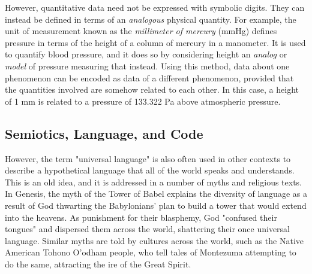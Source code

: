 However, quantitative data need not be expressed with symbolic digits. They can instead be defined in terms of an \textit{analogous} physical quantity. For example, the unit of measurement known as the \textit{millimeter of mercury} (mmHg) defines pressure in terms of the height of a column of mercury in a manometer. It is used to quantify blood pressure, and it does so by considering height an \textit{analog} or \textit{model} of pressure measuring that instead. Using this method, data about one phenomenon can be encoded as data of a different phenomenon, provided that the quantities involved are somehow related to each other. In this case, a height of 1 mm is related to a pressure of 133.322 Pa above atmospheric pressure. \\





\subsection{Semiotics, Language, and Code}



However, the term "universal language" is also often used in other contexts to describe a hypothetical language that all of the world speaks and understands. This is an old idea, and it is addressed in a number of myths and religious texts. In Genesis, the myth of the Tower of Babel explains the diversity of language as a result of God thwarting the Babylonians' plan to build a tower that would extend into the heavens. As punishment for their blasphemy, God "confused their tongues" and dispersed them across the world, shattering their once universal language. Similar myths are told by cultures across the world, such as the Native American Tohono O'odham people, who tell tales of Montezuma attempting to do the same, attracting the ire of the Great Spirit. \\

